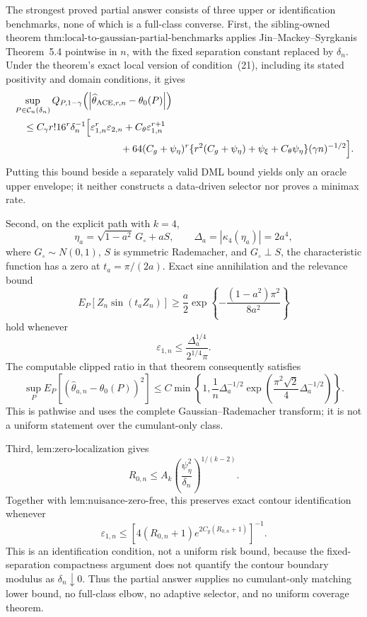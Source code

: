 The strongest proved partial answer consists of three upper or identification benchmarks, none of which is a full-class converse.  First, the sibling-owned theorem \(\text{thm:local-to-gaussian-partial-benchmarks}\) applies Jin--Mackey--Syrgkanis Theorem~5.4 pointwise in \(n\), with the fixed separation constant replaced by \(\delta_n\).  Under the theorem's exact local version of condition~(21), including its stated positivity and domain conditions, it gives
\[
\begin{aligned}
 &\sup_{P\in\mathcal C_n(\delta_n)}
 Q_{P,1-\gamma}
 \!\left(\left|\widehat\theta_{\mathrm{ACE},r,n}-\theta_0(P)\right|\right)\\
 &\quad\le
 C_{\gamma}r!16^r\delta_n^{-1}
 \Bigl[
   \varepsilon_{1,n}^r\varepsilon_{2,n}
   +C_{\theta}\varepsilon_{1,n}^{r+1}\\
 &\hspace{38mm}
   +64(C_g+\psi_{\eta})^r
    \{r^2(C_g+\psi_{\eta})+\psi_{\xi}+C_{\theta}\psi_{\eta}\}
    (\gamma n)^{-1/2}
 \Bigr].
\end{aligned}
\]
Putting this bound beside a separately valid DML bound yields only an oracle upper envelope; it neither constructs a data-driven selector nor proves a minimax rate.

Second, on the explicit path with \(k=4\),
\[
 \eta_a=\sqrt{1-a^2}\,G_{\circ}+aS,
 \qquad
 \Delta_a=\left|\kappa_4(\eta_a)\right|=2a^4,
\]
where \(G_{\circ}\sim N(0,1)\), \(S\) is symmetric Rademacher, and \(G_{\circ}\perp S\), the characteristic function has a zero at \(t_a=\pi/(2a)\).  Exact sine annihilation and the relevance bound
\[
 E_P[Z_n\sin(t_aZ_n)]
 \ge \frac a2
 \exp\!\left\{-\frac{(1-a^2)\pi^2}{8a^2}\right\}
\]
hold whenever
\[
 \varepsilon_{1,n}
 \le \frac{\Delta_a^{1/4}}{2^{1/4}\pi}.
\]
The computable clipped ratio in that theorem consequently satisfies
\[
 \sup_P E_P\!\left[
   (\widehat\theta_{a,n}-\theta_0(P))^2
 \right]
 \le
 C\min\!\left\{
  1,\frac1n\Delta_a^{-1/2}
  \exp\!\left(
    \frac{\pi^2\sqrt2}{4}\Delta_a^{-1/2}
  \right)
 \right\}.
\]
This is pathwise and uses the complete Gaussian--Rademacher transform; it is not a uniform statement over the cumulant-only class.

Third, \(\text{lem:zero-localization}\) gives
\[
 R_{0,n}
 \le
 A_k\left(\frac{\psi_{\eta}^2}{\delta_n}\right)^{1/(k-2)}.
\]
Together with \(\text{lem:nuisance-zero-free}\), this preserves exact contour identification whenever
\[
 \varepsilon_{1,n}
 \le
 \left[
 4(R_{0,n}+1)e^{2C_g(R_{0,n}+1)}
 \right]^{-1}.
\]
This is an identification condition, not a uniform risk bound, because the fixed-separation compactness argument does not quantify the contour boundary modulus as \(\delta_n\downarrow0\).  Thus the partial answer supplies no cumulant-only matching lower bound, no full-class elbow, no adaptive selector, and no uniform coverage theorem.